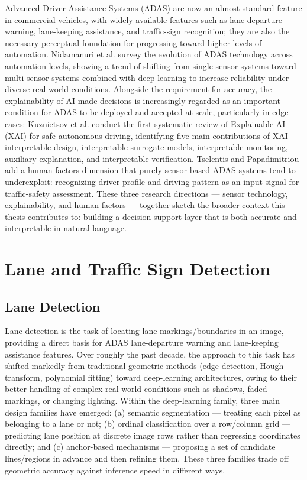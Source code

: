 \documentclass[12pt,a4paper]{report}
\begin{document}
Advanced Driver Assistance Systems (ADAS) are now an almost standard feature in commercial vehicles, with widely available features such as lane-departure warning, lane-keeping assistance, and traffic-sign recognition; they are also the necessary perceptual foundation for progressing toward higher levels of automation. Nidamanuri et al. \cite{nidamanuri2022adas} survey the evolution of ADAS technology across automation levels, showing a trend of shifting from single-sensor systems toward multi-sensor systems combined with deep learning to increase reliability under diverse real-world conditions. Alongside the requirement for accuracy, the explainability of AI-made decisions is increasingly regarded as an important condition for ADAS to be deployed and accepted at scale, particularly in edge cases: Kuznietsov et al. \cite{kuznietsov2024xai} conduct the first systematic review of Explainable AI (XAI) for safe autonomous driving, identifying five main contributions of XAI --- interpretable design, interpretable surrogate models, interpretable monitoring, auxiliary explanation, and interpretable verification. Tselentis and Papadimitriou \cite{tselentis2023driverprofile} add a human-factors dimension that purely sensor-based ADAS systems tend to underexploit: recognizing driver profile and driving pattern as an input signal for traffic-safety assessment. These three research directions --- sensor technology, explainability, and human factors --- together sketch the broader context this thesis contributes to: building a decision-support layer that is both accurate and interpretable in natural language.

\section{Lane and Traffic Sign Detection}

\subsection{Lane Detection}

Lane detection is the task of locating lane markings/boundaries in an image, providing a direct basis for ADAS lane-departure warning and lane-keeping assistance features. Over roughly the past decade, the approach to this task has shifted markedly from traditional geometric methods (edge detection, Hough transform, polynomial fitting) toward deep-learning architectures, owing to their better handling of complex real-world conditions such as shadows, faded markings, or changing lighting. Within the deep-learning family, three main design families have emerged: (a) semantic segmentation --- treating each pixel as belonging to a lane or not; (b) ordinal classification over a row/column grid --- predicting lane position at discrete image rows rather than regressing coordinates directly; and (c) anchor-based mechanisms --- proposing a set of candidate lines/regions in advance and then refining them. These three families trade off geometric accuracy against inference speed in different ways.
\end{document}
